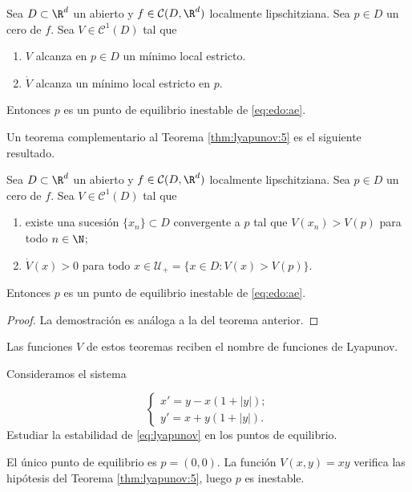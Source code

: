 \begin{corollary}
  Sea $D \subset \R^d$ un abierto y $f \in \mathcal{C}(D, \R^d)$ localmente lipschitziana. Sea
  $p \in D$ un cero de $f$.  Sea $V \in \mathcal{C}^1(D)$ tal que
  \begin{enumerate}
  \item $V$ alcanza en $p \in D$ un mínimo local estricto.
  \item $\dot{V}$ alcanza un mínimo local estricto en $p$.
  \end{enumerate}

  Entonces $p$ es un punto de equilibrio inestable de \eqref{eq:edo:ae}.
\end{corollary}

Un teorema complementario al Teorema \ref{thm:lyapunov:5} es el siguiente resultado.

\begin{theorem} 
  \label{thm:chetaev}
  Sea $D \subset \R^d$ un abierto y $f \in \mathcal{C}(D, \R^d)$ localmente lipschitziana. Sea
  $p \in D$ un cero de $f$.  Sea $V \in \mathcal{C}^1(D)$ tal que
  \begin{enumerate}
  \item existe una sucesión $\{x_n\} \subset D$ convergente a $p$ tal que $V(x_n) > V(p)$ para todo
    $n \in \N$;
  \item $\dot{V}(x) > 0$ para todo $x \in \mathcal{U}_+ = \{x \in D : V(x) > V(p)\}$.
  \end{enumerate}
  Entonces $p$ es un punto de equilibrio inestable de \eqref{eq:edo:ae}.
\end{theorem}
\begin{proof}
  La demostración es análoga a la del teorema anterior.
\end{proof}

Las funciones $V$ de estos teoremas reciben el nombre de funciones de Lyapunov.

\begin{ex}
  Consideramos el sistema
  
  \begin{equation}
    \label{eq:lyapunov}
    \begin{cases}
      x' = y - x(1+|y|);\\
      y ' = x + y (1+|y|).
    \end{cases}
  \end{equation}
  Estudiar la estabilidad de \eqref{eq:lyapunov} en los puntos de equilibrio.

  El único punto de equilibrio es $p = (0,0)$. La función $V(x,y) = xy$ verifica las hipótesis del
  Teorema \ref{thm:lyapunov:5}, luego $p$ es inestable.
\end{ex}

